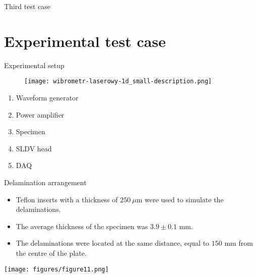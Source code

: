 \documentclass[10pt,aspectratio=169]{beamer} %
\begin{document}
\setcounter{subfigure}{0}
\begin{frame}{Third test case}
	\begin{figure}
		\centering
		\quad
		\quad
	\end{figure}
\end{frame}

\section{Experimental test case}
\setcounter{subfigure}{0}
\begin{frame}{Experimental setup}
	\begin{minipage}[t]{0.55\textwidth}
		\begin{figure}
			\centering
			\texttt{[image: wibrometr-laserowy-1d\_small-description.png]}
		\end{figure}
	\end{minipage}
	\begin{minipage}[t]{0.4\textwidth}
		\begin{enumerate}[<alert@+>]
			\item Waveform generator
			\item Power amplifier	
			\item Specimen
			\item SLDV head
			\item DAQ
		\end{enumerate}
	\end{minipage}
\end{frame}

\setcounter{subfigure}{0}
\begin{frame}{Delamination arrangement}
	\begin{minipage}[c]{0.4\textwidth}
		\begin{itemize}[<alert@+>]
			\item Teflon inserts with a thickness of \(250\ \mu\)m were used to simulate the delaminations.
			\item The average thickness of the specimen was \(3.9 \pm 0.1\) mm.
			\item The delaminations were located at the same distance, equal to \(150\) mm from the centre of the plate.
		\end{itemize}
	\end{minipage}
	\begin{minipage}[c]{0.55\textwidth}
		\centering
		\texttt{[image: figures/figure11.png]}
	\end{minipage}
\end{frame}
\end{document}
